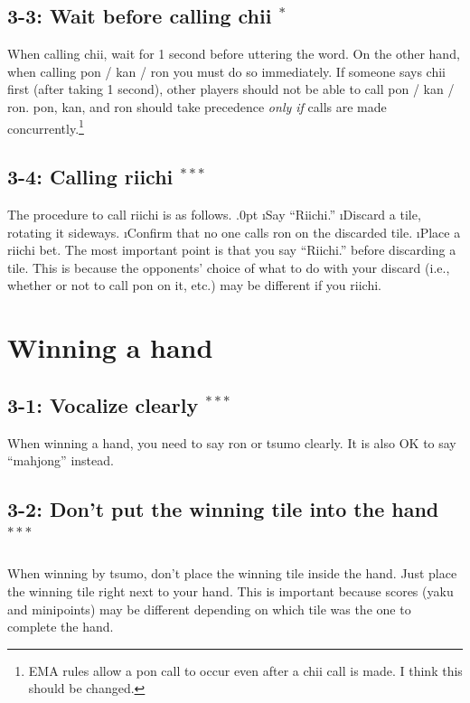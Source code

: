\subsection*{3-3: Wait before calling {\jap chii} $^{*}$}
When calling {\jap chii}, wait for 1 second before uttering the word. On the other hand, when calling {\jap pon} / {\jap kan} / {\jap ron} you must do so immediately. If someone says {\jap chii} first (after taking 1 second), other players should not be able to call {\jap pon} / {\jap kan} / {\jap ron}. {\jap pon}, {\jap kan}, and {\jap ron} should take precedence \emph{only if} calls are made concurrently.\footnote{EMA rules allow a {\jap pon} call to occur even after a {\jap chii} call is made. I think this should be changed.}

\subsection*{3-4: Calling {\jap riichi} $^{***}$}
The procedure to call {\jap riichi} is as follows.
\be\itemsep.0pt
\i Say ``{\jap Riichi}.''
\i Discard a tile, rotating it sideways.
\i Confirm that no one calls {\jap ron} on the discarded tile.
\i Place a {\jap riichi} bet.
\ee
The most important point is that you say ``{\jap Riichi}.'' before discarding a tile. This is because the opponents' choice of what to do with your discard (i.e., whether or not to call {\jap pon} on it, etc.) may be different if you {\jap riichi}.

\section{Winning a hand}

\subsection*{3-1: Vocalize clearly $^{***}$}
When winning a hand, you need to say {\jap ron} or {\jap tsumo} clearly. It is also OK to say ``mahjong'' instead. 

\subsection*{3-2: Don't put the winning tile into the hand $^{***}$}
When winning by {\jap tsumo}, don't place the winning tile inside the hand. Just place the winning tile right next to your hand. This is important because scores ({\jap yaku} and minipoints) may be different depending on which tile was the one to complete the hand. 

